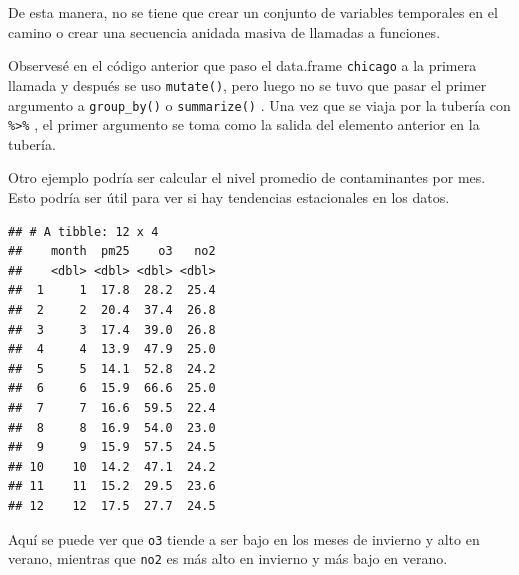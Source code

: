 \documentclass[
]{book}
\newenvironment{Shaded}{\begin{snugshade}}{\end{snugshade}}
\newcommand{\AttributeTok}[1]{\textcolor[rgb]{0.77,0.63,0.00}{#1}}
\newcommand{\ConstantTok}[1]{\textcolor[rgb]{0.00,0.00,0.00}{#1}}
\newcommand{\DecValTok}[1]{\textcolor[rgb]{0.00,0.00,0.81}{#1}}
\newcommand{\FunctionTok}[1]{\textcolor[rgb]{0.00,0.00,0.00}{#1}}
\newcommand{\NormalTok}[1]{#1}
\newcommand{\SpecialCharTok}[1]{\textcolor[rgb]{0.00,0.00,0.00}{#1}}
\newcommand{\StringTok}[1]{\textcolor[rgb]{0.31,0.60,0.02}{#1}}
\begin{document}
De esta manera, no se tiene que crear un conjunto de variables temporales en el camino o crear una secuencia anidada masiva de llamadas a funciones.

Observesé en el código anterior que paso el data.frame \texttt{chicago} a la primera llamada y después se uso \texttt{mutate()}, pero luego no se tuvo que pasar el primer argumento a \texttt{group\_by()} o \texttt{summarize()} . Una vez que se viaja por la tubería con \texttt{\%\textgreater{}\%} , el primer argumento se toma como la salida del elemento anterior en la tubería.

Otro ejemplo podría ser calcular el nivel promedio de contaminantes por mes. Esto podría ser útil para ver si hay tendencias estacionales en los datos.

\begin{Shaded}
\end{Shaded}

\begin{verbatim}
## # A tibble: 12 x 4
##    month  pm25    o3   no2
##    <dbl> <dbl> <dbl> <dbl>
##  1     1  17.8  28.2  25.4
##  2     2  20.4  37.4  26.8
##  3     3  17.4  39.0  26.8
##  4     4  13.9  47.9  25.0
##  5     5  14.1  52.8  24.2
##  6     6  15.9  66.6  25.0
##  7     7  16.6  59.5  22.4
##  8     8  16.9  54.0  23.0
##  9     9  15.9  57.5  24.5
## 10    10  14.2  47.1  24.2
## 11    11  15.2  29.5  23.6
## 12    12  17.5  27.7  24.5
\end{verbatim}

Aquí se puede ver que \texttt{o3} tiende a ser bajo en los meses de invierno y alto en verano, mientras que \texttt{no2} es más alto en invierno y más bajo en verano.
\end{document}
